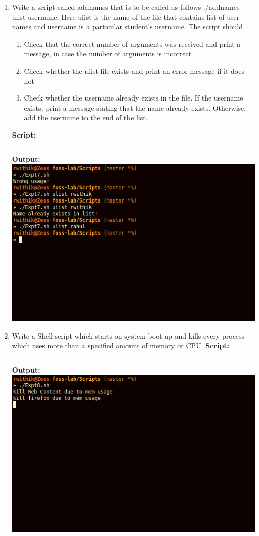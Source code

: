 \documentclass[10pt,a4paper,titlepage]{report}
\begin{document}
\begin{enumerate}
\pagebreak
\item Write a script called addnames that is to be called as follows ./addnames ulist username. Here ulist is the name of the file that contains list of user names and username is a particular student's username. The script should
\begin{enumerate}
\item Check that the correct number of arguments was received and print a message, in case the	number of arguments is incorrect
\item Check whether the ulist file exists and print an error message if it does not
\item Check whether the username already exists in the file. If the username exists, print a message stating that the name already exists. Otherwise, add the username to the end of the list.
\end{enumerate}
\textbf{Script:}\newline
\inputminted{bash}{../Scripts/Expt7.sh}
\textbf{Output:}\newline
\includegraphics[width=\linewidth]{../Images/Shell1/4.png}
\pagebreak
\item Write a Shell script which starts on system boot up and kills every process which uses more than a specified amount of memory or CPU.\newline
\textbf{Script:}\newline
\inputminted{bash}{../Scripts/Expt8.sh}
\textbf{Output:}\newline
\includegraphics[width=\linewidth]{../Images/Shell1/5.png}
\end{enumerate}
\end{document}
